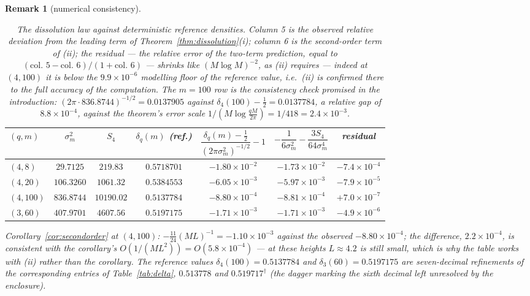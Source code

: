 \documentclass[11pt]{article}
\newtheorem{remark}{Remark}
\begin{document}
\begin{remark}[numerical consistency]
\begin{table}[h]\centering
\begin{tabular}{lcccccc}
\toprule
$(q,m)$ & $\sigma_m^2$ & $S_4$ & $\delta_q(m)$ (ref.) &
$\dfrac{\delta_q(m)-\frac12}{(2\pi\sigma_m^2)^{-1/2}}-1$ &
$-\dfrac1{6\sigma_m^2}-\dfrac{3S_4}{64\sigma_m^4}$ &
residual \\
\midrule
$(4,8)$   & $29.7125$  & $219.83$   & $0.5718701$ & $-1.80\times10^{-2}$ & $-1.73\times10^{-2}$ & $-7.4\times10^{-4}$ \\
$(4,20)$  & $106.3260$ & $1061.32$  & $0.5384553$ & $-6.05\times10^{-3}$ & $-5.97\times10^{-3}$ & $-7.9\times10^{-5}$ \\
$(4,100)$ & $836.8744$ & $10190.02$ & $0.5137784$ & $-8.80\times10^{-4}$ & $-8.81\times10^{-4}$ & $+7.0\times10^{-7}$ \\
$(3,60)$  & $407.9701$ & $4607.56$  & $0.5197175$ & $-1.71\times10^{-3}$ & $-1.71\times10^{-3}$ & $-4.9\times10^{-6}$ \\
\bottomrule
\end{tabular}
\caption{The dissolution law against deterministic reference
densities. Column 5 is the observed relative deviation from the
leading term of Theorem~\ref{thm:dissolution}(i); column 6 is the
second-order term of (ii); the residual --- the relative error of the
two-term prediction, equal to
$(\text{col.~5}-\text{col.~6})/(1+\text{col.~6})$ --- shrinks like
$(M\log M)^{-2}$, as (ii) requires --- indeed at $(4,100)$ it is below
the $9.9\times10^{-6}$ modelling floor of the reference value, i.e.\
(ii) is confirmed there to the full accuracy of the computation. The
$m=100$ row is the consistency check promised in the introduction:
$(2\pi\cdot836.8744)^{-1/2}=0.0137905$ against
$\delta_4(100)-\tfrac12=0.0137784$, a relative gap of
$8.8\times10^{-4}$, against the theorem's error scale
$1/(M\log\tfrac{qM}{2\pi})=1/418=2.4\times10^{-3}$.}
\label{tab:dissolution}
\end{table}

Corollary~\ref{cor:secondorder} at $(4,100)$: $-\tfrac{11}{24}(ML)^{-1}
=-1.10\times10^{-3}$ against the observed $-8.80\times10^{-4}$; the
difference, $2.2\times10^{-4}$, is consistent with the corollary's
$O(1/(ML^2))=O(5.8\times10^{-4})$ --- at these heights $L\approx4.2$
is still small, which is why the table works with (ii) rather than
the corollary. The reference values $\delta_4(100)=0.5137784$ and
$\delta_3(60)=0.5197175$ are seven-decimal refinements of the
corresponding entries of Table~\ref{tab:delta}, $0.513778$ and
$0.519717^{\dagger}$ (the dagger marking the sixth decimal left
unresolved by the enclosure).
\end{remark}
\end{document}
